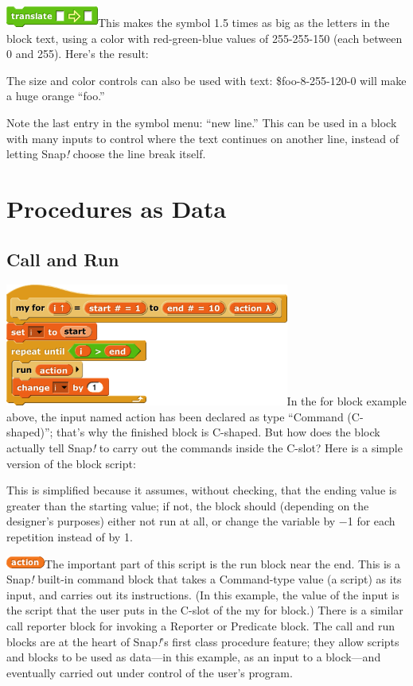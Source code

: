 \includegraphics[width=1.19792in,height=0.27083in]{media/image691.png}This
makes the symbol 1.5 times as big as the letters in the block text,
using a color with red-green-blue values of 255-255-150 (each between 0
and 255). Here's the result:

The size and color controls can also be used with text:
\$foo-8-255-120-0 will make a huge orange ``foo.''

Note the last entry in the symbol menu: ``new line.'' This can be used
in a block with many inputs to control where the text continues on
another line, instead of letting Snap\emph{!} choose the line break
itself.

\section{Procedures as Data}\label{procedures-as-data}

\subsection{Call and Run}\label{call-and-run}

\includegraphics[width=3.67292in,height=1.58333in]{media/image692.png}In
the for block example above, the input named action has been declared as
type ``Command (C-shaped)''; that's why the finished block is C-shaped.
But how does the block actually tell Snap\emph{!} to carry out the
commands inside the C-slot? Here is a simple version of the block
script:

This is simplified because it assumes, without checking, that the ending
value is greater than the starting value; if not, the block should
(depending on the designer's purposes) either not run at all, or change
the variable by −1 for each repetition instead of by 1.

\includegraphics[width=0.5in,height=0.15625in]{media/image693.png}The
important part of this script is the run block near the end. This is a
Snap\emph{!} built-in command block that takes a Command-type value (a
script) as its input, and carries out its instructions. (In this
example, the value of the input is the script that the user puts in the
C-slot of the my for block.) There is a similar call reporter block for
invoking a Reporter or Predicate block. The call and run blocks are at
the heart of Snap\emph{!}'s ﬁrst class procedure feature; they allow
scripts and blocks to be used as data---in this example, as an input to
a block---and eventually carried out under control of the user's
program.


